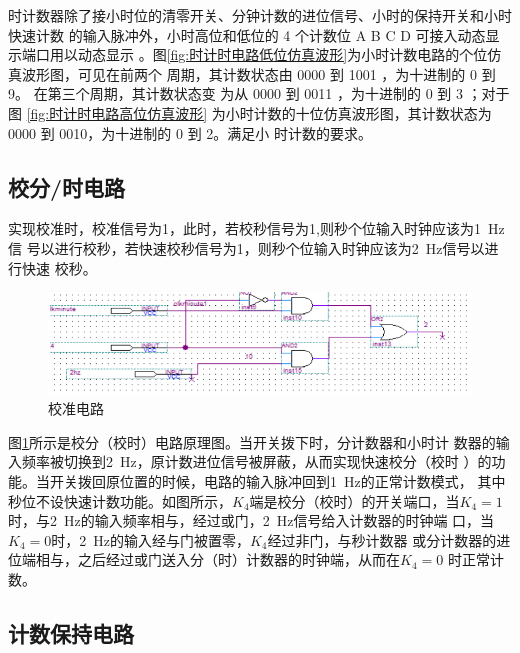 \documentclass[twoside, openright]{article}
\begin{document}
时计数器除了接小时位的清零开关、分钟计数的进位信号、小时的保持开关和小时快速计数
的输入脉冲外，小时高位和低位的 4 个计数位 A B C D 可接入动态显示端口用以动态显示
。图\ref{fig:时计时电路低位仿真波形}为小时计数电路的个位仿真波形图，可见在前两个
周期，其计数状态由 0000 到 1001 ，为十进制的 0 到 9。 在第三个周期，其计数状态变
为从 0000 到 0011 ，为十进制的 0 到 3 ；对于图 \ref{fig:时计时电路高位仿真波形}
为小时计数的十位仿真波形图，其计数状态为 0000 到 0010，为十进制的 0 到 2。满足小
时计数的要求。

\subsection{校分/时电路}%
\label{sub:校分/时电路}

实现校准时，校准信号为1，此时，若校秒信号为1,则秒个位输入时钟应该为\SI{1}{\Hz}信
号以进行校秒，若快速校秒信号为1，则秒个位输入时钟应该为\SI{2}{\Hz}信号以进行快速
校秒。

\begin{figure}[htbp]
	\centering
	\includegraphics[width = 0.8\linewidth]{calibrate.png}
	\caption{校准电路}
	\label{fig:校准电路}
\end{figure}

图\ref{fig:校准电路}所示是校分（校时）电路原理图。当开关拨下时，分计数器和小时计
数器的输入频率被切换到\SI{2}{\Hz}，原计数进位信号被屏蔽，从而实现快速校分（校时
）的功能。当开关拨回原位置的时候，电路的输入脉冲回到\SI{1}{\Hz}的正常计数模式，
其中秒位不设快速计数功能。如图所示，$ K_4 $端是校分（校时）的开关端口，当$ K_4 =
1 $时，与\SI{2}{\Hz}的输入频率相与，经过或门，\SI{2}{\Hz}信号给入计数器的时钟端
口，当$ K_4 = 0 $时，\SI{2}{\Hz}的输入经与门被置零，$ K_4 $经过非门，与秒计数器
或分计数器的进位端相与，之后经过或门送入分（时）计数器的时钟端，从而在$ K_4 = 0
$ 时正常计数。

\subsection{计数保持电路}%
\label{sub:计数保持电路}
\end{document}
